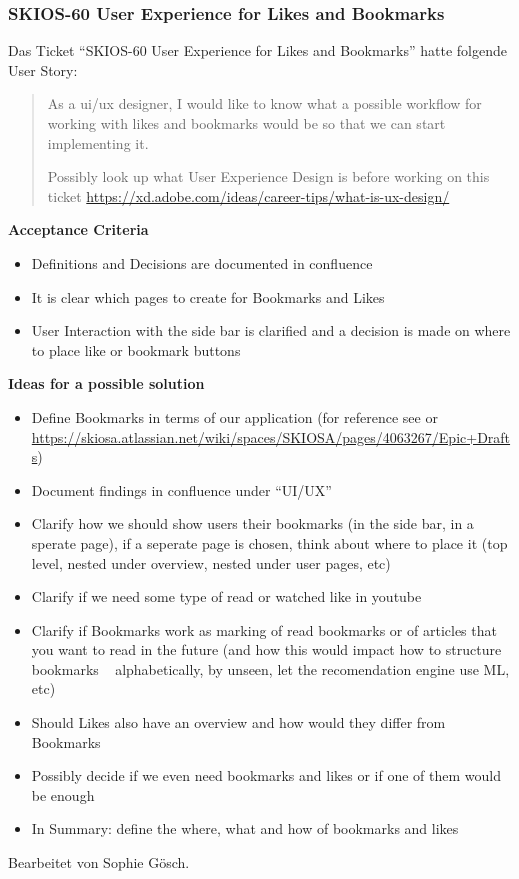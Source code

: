 \subsubsection{SKIOS-60 User Experience for Likes and Bookmarks}
Das Ticket \enquote{SKIOS-60 User Experience for Likes and Bookmarks} hatte folgende User Story:
\begin{quotation}
    As a ui/ux designer, I would like to know what a possible workflow for working with likes and bookmarks would be so that we can start implementing it.

    Possibly look up what User Experience Design is before working on this ticket \url{https://xd.adobe.com/ideas/career-tips/what-is-ux-design/}
\end{quotation}
\textbf{Acceptance Criteria}
    \begin{itemize}
        \item Definitions and Decisions are documented in confluence
        \item It is clear which pages to create for Bookmarks and Likes
        \item User Interaction with the side bar is clarified and a decision is made on where to place like or bookmark buttons
    \end{itemize}
\textbf{Ideas for a possible solution}
    \begin{itemize}
        \item Define Bookmarks in terms of our application (for reference see  or \url{https://skiosa.atlassian.net/wiki/spaces/SKIOSA/pages/4063267/Epic+Drafts})
        \item Document findings in confluence under “UI/UX”
        \item Clarify how we should show users their bookmarks (in the side bar, in a sperate page), if a seperate page is chosen, think about where to place it (top level, nested under overview, nested under user pages, etc)
        \item Clarify if we need some type of read or watched like in youtube
        \item Clarify if Bookmarks work as marking of read bookmarks or of articles that you want to read in the future (and how this would impact how to structure bookmarks  ~ alphabetically, by unseen, let the recomendation engine use ML, etc)
        \item Should Likes also have an overview and how would they differ from Bookmarks
        \item Possibly decide if we even need bookmarks and likes or if one of them would be enough
        \item In Summary: define the where, what and how of bookmarks and likes
    \end{itemize}
Bearbeitet von Sophie Gösch.

